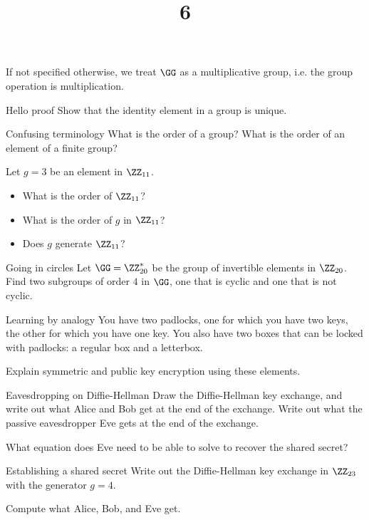 \documentclass{practice}
\title{6}
\date{\DTMdate{2024-10-16}}
\begin{document}
\maketitle

If not specified otherwise, we treat $\GG$ as a multiplicative group, i.e. the group operation is multiplication.

\begin{task}{Hello proof}
  Show that the identity element in a group is unique.
\end{task}

\begin{task}{Confusing terminology}
  What is the order of a group?
  What is the order of an element of a finite group?

  Let $g = 3$ be an element in $\ZZ_{11}$.
  \begin{itemize}
    \item What is the order of $\ZZ_{11}$?
    \item What is the order of $g$ in $\ZZ_{11}$?
    \item Does $g$ generate $\ZZ_{11}$?
  \end{itemize}
\end{task}

\begin{task}{Going in circles}
  Let $\GG = \ZZ^*_{20}$ be the group of invertible elements in $\ZZ_{20}$.
  Find two subgroups of order $4$ in $\GG$, one that is cyclic and one that is not cyclic.
\end{task}

\begin{task}{Learning by analogy}
  You have two padlocks, one for which you have two keys, the other for which you have one key.
  You also have two boxes that can be locked with padlocks: a regular box and a letterbox.

  Explain symmetric and public key encryption using these elements.
\end{task}

\begin{task}{Eavesdropping on Diffie-Hellman}
  Draw the Diffie-Hellman key exchange, and write out what Alice and Bob get at the end of the exchange.
  Write out what the passive eavesdropper Eve gets at the end of the exchange.

  What equation does Eve need to be able to solve to recover the shared secret?
\end{task}

\begin{task}{Establishing a shared secret}
  Write out the Diffie-Hellman key exchange in $\ZZ_{23}$ with the generator $g = 4$.

  Compute what Alice, Bob, and Eve get.
\end{task}
\end{document}
